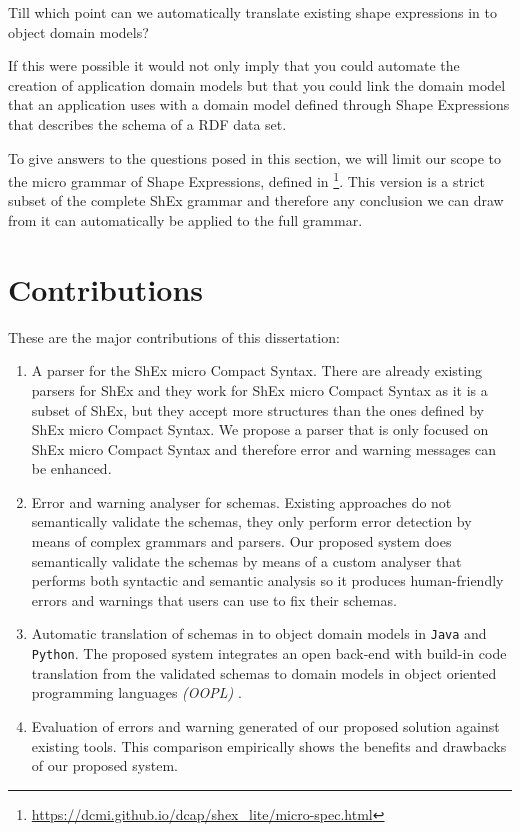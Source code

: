 \begin{researchquestion}
  Till which point can we automatically translate existing shape expressions in to object domain models?
\end{researchquestion}

If this were possible it would not only imply that you could automate the creation of application domain models but that you could link the domain model that an
application uses with a domain model defined through Shape Expressions that describes the schema of a RDF data set.

\bigskip

To give answers to the questions posed in this section, we will limit our scope to the micro grammar of Shape Expressions, defined in
\footnote{\url{https://dcmi.github.io/dcap/shex_lite/micro-spec.html}}. This version is a strict subset of the complete ShEx grammar
and therefore any conclusion we can draw from it can automatically be applied to the full grammar.


\section{Contributions}
\label{sec:intro-contri}
These are the major contributions of this dissertation:

\begin{enumerate}
  \item A parser for the ShEx micro Compact Syntax. There are already existing parsers for ShEx and they work for ShEx micro Compact Syntax
  as it is a subset of ShEx, but they accept more structures than the ones defined by ShEx micro Compact Syntax. We propose a parser that
  is only focused on ShEx micro Compact Syntax and therefore error and warning messages can be enhanced.
  
  \item Error and warning analyser for schemas. Existing approaches do not semantically validate the schemas, they
  only perform error detection by means of complex grammars and parsers. Our proposed system does semantically validate the schemas by means
  of a custom analyser that performs both syntactic and semantic analysis so it produces human-friendly errors and warnings that users can
  use to fix their schemas.

  \item Automatic translation of schemas in to object domain models in \texttt{Java} and \texttt{Python}. The proposed system
  integrates an open back-end with build-in code translation from the validated schemas to domain models in object
  oriented programming languages \textit{(OOPL)} \cite{oopl}.

  \item Evaluation of errors and warning generated of our proposed solution against existing tools. This comparison
  empirically shows the benefits and drawbacks of our proposed system.
\end{enumerate}

